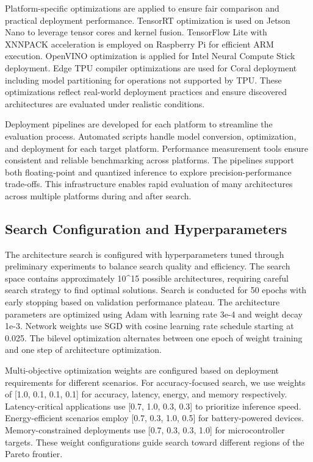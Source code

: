 \documentclass[journal]{IEEEtran}
\begin{document}
Platform-specific optimizations are applied to ensure fair comparison and practical deployment performance. TensorRT optimization is used on Jetson Nano to leverage tensor cores and kernel fusion. TensorFlow Lite with XNNPACK acceleration is employed on Raspberry Pi for efficient ARM execution. OpenVINO optimization is applied for Intel Neural Compute Stick deployment. Edge TPU compiler optimizations are used for Coral deployment including model partitioning for operations not supported by TPU. These optimizations reflect real-world deployment practices and ensure discovered architectures are evaluated under realistic conditions.

Deployment pipelines are developed for each platform to streamline the evaluation process. Automated scripts handle model conversion, optimization, and deployment for each target platform. Performance measurement tools ensure consistent and reliable benchmarking across platforms. The pipelines support both floating-point and quantized inference to explore precision-performance trade-offs. This infrastructure enables rapid evaluation of many architectures across multiple platforms during and after search.

\subsection{Search Configuration and Hyperparameters}

The architecture search is configured with hyperparameters tuned through preliminary experiments to balance search quality and efficiency. The search space contains approximately 10^15 possible architectures, requiring careful search strategy to find optimal solutions. Search is conducted for 50 epochs with early stopping based on validation performance plateau. The architecture parameters are optimized using Adam with learning rate 3e-4 and weight decay 1e-3. Network weights use SGD with cosine learning rate schedule starting at 0.025. The bilevel optimization alternates between one epoch of weight training and one step of architecture optimization.

Multi-objective optimization weights are configured based on deployment requirements for different scenarios. For accuracy-focused search, we use weights of [1.0, 0.1, 0.1, 0.1] for accuracy, latency, energy, and memory respectively. Latency-critical applications use [0.7, 1.0, 0.3, 0.3] to prioritize inference speed. Energy-efficient scenarios employ [0.7, 0.3, 1.0, 0.5] for battery-powered devices. Memory-constrained deployments use [0.7, 0.3, 0.3, 1.0] for microcontroller targets. These weight configurations guide search toward different regions of the Pareto frontier.
\end{document}
